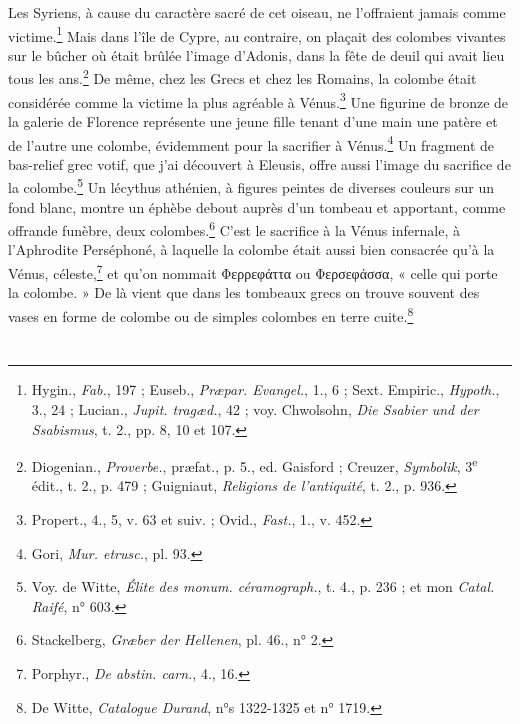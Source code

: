 \documentclass[a4paper, 11pt, oneside]{article}
\begin{document}
Les Syriens, à cause du caractère sacré de cet oiseau, ne l'offraient jamais comme victime.\footnote{Hygin., \emph{Fab.}, 197 ; Euseb., \emph{Præpar. Evangel.}, 1., 6 ; Sext. Empiric., \emph{Hypoth.}, 3., 24 ; Lucian., \emph{Jupit. tragæd.}, 42 ; voy. Chwolsohn, \emph{Die Ssabier und der Ssabismus}, t. 2., pp. 8, 10 et 107.} Mais dans l'île de Cypre, au contraire, on plaçait des colombes vivantes sur le bûcher où était brûlée l'image d'Adonis, dans la fête de deuil qui avait lieu tous les ans.\footnote{Diogenian., \emph{Proverbe.}, præfat., p. 5., ed. Gaisford ; Creuzer, \emph{Symbolik}, 3\textsuperscript{e} édit., t. 2., p. 479 ; Guigniaut, \emph{Religions de l'antiquité}, t. 2., p. 936.} De même, chez les Grecs et chez les Romains, la colombe était considérée comme la victime la plus agréable à Vénus.\footnote{Propert., 4., 5, v. 63 et suiv. ; Ovid., \emph{Fast.}, 1., v. 452.} Une figurine de bronze de la galerie de Florence représente une jeune fille tenant d'une main une patère et de l'autre une colombe, évidemment pour la sacrifier à Vénus.\footnote{Gori, \emph{Mur. etrusc.}, pl. 93.} Un fragment de bas-relief grec votif, que j'ai découvert à Eleusis, offre aussi l'image du sacrifice de la colombe.\footnote{Voy. de Witte, \emph{Élite des monum. céramograph.}, t. 4., p. 236 ; et mon \emph{Catal. Raifé}, n° 603.} Un lécythus athénien, à figures peintes de diverses couleurs sur un fond blanc, montre un éphèbe debout auprès d'un tombeau et apportant, comme offrande funèbre, deux colombes.\footnote{Stackelberg, \emph{Græber der Hellenen}, pl. 46., n° 2.} C'est le sacrifice à la Vénus infernale, à l'Aphrodite Perséphoné, à laquelle la colombe était aussi bien consacrée qu'à la Vénus, céleste,\footnote{Porphyr., \emph{De abstin. carn.}, 4., 16.} et qu'on nommait Φερρεφάττα ou Φερσεφάσσα, « celle qui porte la colombe. » De là vient que dans les tombeaux grecs on trouve souvent des vases en forme de colombe ou de simples colombes en terre cuite.\footnote{De Witte, \emph{Catalogue Durand}, n°s 1322-1325 et n° 1719.} 

\bigskip \centerline{\EightStarTaper} \centerline{\EightStarTaper\EightStarTaper} \bigskip\clearpage
\section{}
\end{document}
